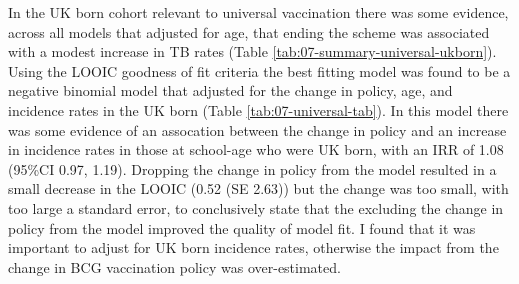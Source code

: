 \documentclass[11pt,twoside]{bristolthesis}
\begin{document}
  In the UK born cohort relevant to universal vaccination there was some evidence, across all models that adjusted for age, that ending the scheme was associated with a modest increase in TB rates (Table \ref{tab:07-summary-universal-ukborn}). Using the LOOIC goodness of fit criteria the best fitting model was found to be a negative binomial model that adjusted for the change in policy, age, and incidence rates in the UK born (Table \ref{tab:07-universal-tab}). In this model there was some evidence of an assocation between the change in policy and an increase in incidence rates in those at school-age who were UK born, with an IRR of 1.08 (95\%CI 0.97, 1.19). Dropping the change in policy from the model resulted in a small decrease in the LOOIC (0.52 (SE 2.63)) but the change was too small, with too large a standard error, to conclusively state that the excluding the change in policy from the model improved the quality of model fit. I found that it was important to adjust for UK born incidence rates, otherwise the impact from the change in BCG vaccination policy was over-estimated.
  
\end{document}

